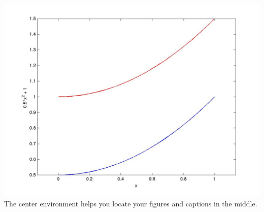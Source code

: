 \documentclass[12pt,a4paper]{article}
\begin{document}
\begin{center}
\includegraphics[scale=0.33]{demo.jpg}\\
The center environment helps you locate your figures and captions in the middle. 
\end{center}
\end{document}
